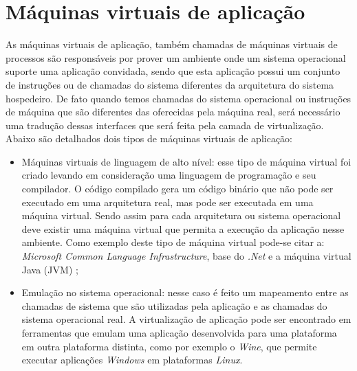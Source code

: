 \section{Máquinas virtuais de aplicação}
\label{section:virtaplicacao}

As máquinas virtuais de aplicação, também chamadas de máquinas virtuais de processos são responsáveis por prover um ambiente
onde um sistema operacional suporte uma aplicação convidada, sendo que esta aplicação possui um conjunto de instruções ou de chamadas
do sistema diferentes da arquitetura do sistema hospedeiro. De fato quando temos chamadas do sistema operacional ou instruções de máquina 
que são diferentes das oferecidas pela máquina real, será necessário uma tradução dessas interfaces que será feita pela camada  de 
virtualização. Abaixo são detalhados dois tipos de máquinas virtuais de aplicação:

\begin{itemize}
 \item Máquinas virtuais de linguagem de alto nível: esse tipo de máquina virtual foi criado levando em consideração uma linguagem de 
 programação e seu compilador. O código compilado gera um código binário que não pode ser executado em uma arquitetura real, mas pode
 ser executada em uma máquina virtual. Sendo assim para cada arquitetura ou sistema operacional deve existir uma máquina virtual que
 permita a execução da aplicação nesse ambiente. Como exemplo deste tipo de máquina virtual pode-se citar a: \textit{Microsoft Common 
 Language Infrastructure}, base do \textit{.Net} e a máquina virtual Java (\ac{JVM}) \cite{carissimi2008};
 \item Emulação no sistema operacional: nesse caso é feito um mapeamento entre as chamadas de sistema que são utilizadas pela aplicação 
 e as chamadas do sistema operacional real. A virtualização de aplicação pode ser encontrado em ferramentas que emulam uma aplicação 
 desenvolvida para uma plataforma em outra plataforma distinta, como por exemplo o \textit{Wine}, que permite executar aplicações 
 \textit{Windows} em plataformas \textit{Linux}.
\end{itemize}


